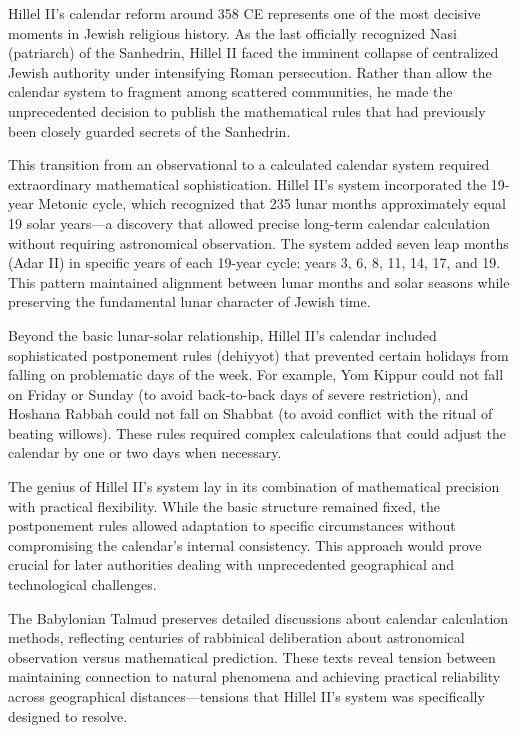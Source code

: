 \begin{historical}
Hillel II's calendar reform around 358 CE represents one of the most decisive moments in Jewish religious history. As the last officially recognized Nasi (patriarch) of the Sanhedrin, Hillel II faced the imminent collapse of centralized Jewish authority under intensifying Roman persecution. Rather than allow the calendar system to fragment among scattered communities, he made the unprecedented decision to publish the mathematical rules that had previously been closely guarded secrets of the Sanhedrin.

This transition from an observational to a calculated calendar system required extraordinary mathematical sophistication. Hillel II's system incorporated the 19-year Metonic cycle, which recognized that 235 lunar months approximately equal 19 solar years—a discovery that allowed precise long-term calendar calculation without requiring astronomical observation. The system added seven leap months (Adar II) in specific years of each 19-year cycle: years 3, 6, 8, 11, 14, 17, and 19. This pattern maintained alignment between lunar months and solar seasons while preserving the fundamental lunar character of Jewish time.

Beyond the basic lunar-solar relationship, Hillel II's calendar included sophisticated postponement rules (dehiyyot) that prevented certain holidays from falling on problematic days of the week. For example, Yom Kippur could not fall on Friday or Sunday (to avoid back-to-back days of severe restriction), and Hoshana Rabbah could not fall on Shabbat (to avoid conflict with the ritual of beating willows). These rules required complex calculations that could adjust the calendar by one or two days when necessary.

The genius of Hillel II's system lay in its combination of mathematical precision with practical flexibility. While the basic structure remained fixed, the postponement rules allowed adaptation to specific circumstances without compromising the calendar's internal consistency. This approach would prove crucial for later authorities dealing with unprecedented geographical and technological challenges.

The Babylonian Talmud preserves detailed discussions about calendar calculation methods, reflecting centuries of rabbinical deliberation about astronomical observation versus mathematical prediction. These texts reveal tension between maintaining connection to natural phenomena and achieving practical reliability across geographical distances—tensions that Hillel II's system was specifically designed to resolve.


\end{historical}
